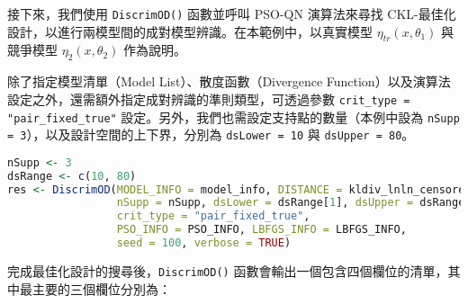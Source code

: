 接下來，我們使用 \verb|DiscrimOD()| 函數並呼叫 PSO-QN 演算法來尋找 CKL-最佳化設計，以進行兩模型間的成對模型辨識。在本範例中，以真實模型 $\eta_{tr}(x, \theta_1)$ 與競爭模型 $\eta_2(x, \theta_2)$ 作為說明。

除了指定模型清單（Model List）、散度函數（Divergence Function）以及演算法設定之外，還需額外指定成對辨識的準則類型，可透過參數 \verb|crit_type = "pair_fixed_true"| 設定。另外，我們也需設定支持點的數量（本例中設為 \verb|nSupp = 3|），以及設計空間的上下界，分別為 \verb|dsLower = 10| 與 \verb|dsUpper = 80|。

\begin{lstlisting}[language=R, caption={執行 DiscrimOD 以獲得最佳設計}]
nSupp <- 3
dsRange <- c(10, 80)
res <- DiscrimOD(MODEL_INFO = model_info, DISTANCE = kldiv_lnln_censored5000,
                 nSupp = nSupp, dsLower = dsRange[1], dsUpper = dsRange[2],
                 crit_type = "pair_fixed_true",
                 PSO_INFO = PSO_INFO, LBFGS_INFO = LBFGS_INFO,
                 seed = 100, verbose = TRUE)
\end{lstlisting}

完成最佳化設計的搜尋後，\verb|DiscrimOD()| 函數會輸出一個包含四個欄位的清單，其中最主要的三個欄位分別為：

